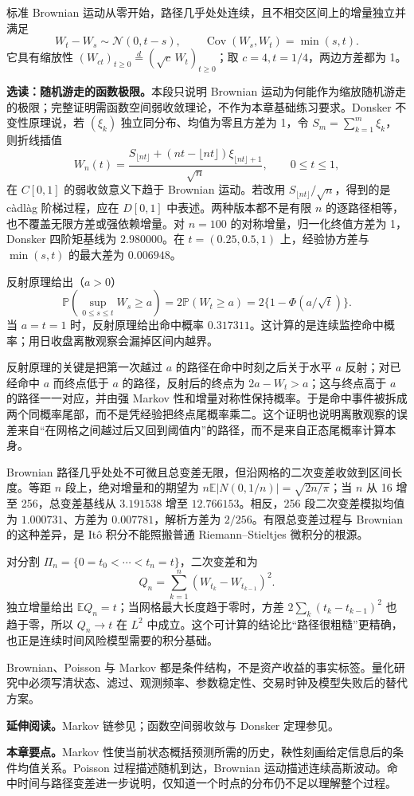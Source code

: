 标准 Brownian 运动从零开始，路径几乎处处连续，且不相交区间上的增量独立并满足
\[
W_t-W_s\sim\mathcal N(0,t-s),\qquad \operatorname{Cov}(W_s,W_t)=\min(s,t).
\]
它具有缩放性 $(W_{ct})_{t\ge0}\overset d=(\sqrt c\,W_t)_{t\ge0}$；取 $c=4,t=1/4$，两边方差都为 1。\par\medskip\noindent\textbf{选读：随机游走的函数极限。}本段只说明 Brownian 运动为何能作为缩放随机游走的极限；完整证明需函数空间弱收敛理论，不作为本章基础练习要求。Donsker 不变性原理说，若 $(\xi_k)$ 独立同分布、均值为零且方差为 1，令 $S_m=\sum_{k=1}^m\xi_k$，则折线插值
\[
 W_n(t)=\frac{S_{\lfloor nt\rfloor}
 +(nt-\lfloor nt\rfloor)\xi_{\lfloor nt\rfloor+1}}{\sqrt n},
 \qquad 0\le t\le1,
\]
在 $C[0,1]$ 的弱收敛意义下趋于 Brownian 运动。若改用
$S_{\lfloor nt\rfloor}/\sqrt n$，得到的是 càdlàg 阶梯过程，应在
$D[0,1]$ 中表述。两种版本都不是有限 $n$ 的逐路径相等，也不覆盖无限方差或强依赖增量。对 $n=100$ 的对称增量，归一化终值方差为 1，Donsker 四阶矩基线为 $2.980000$。在 $t=(0.25,0.5,1)$ 上，经验协方差与 $\min(s,t)$ 的最大差为 $0.006948$。

反射原理给出（$a>0$）
\[
\mathbb P\!\left(\sup_{0\le s\le t}W_s\ge a\right)
=2\mathbb P(W_t\ge a)=2\{1-\Phi(a/\sqrt t)\}.
\]
当 $a=t=1$ 时，反射原理给出命中概率 $0.317311$。这计算的是连续监控命中概率；用日收盘离散观察会漏掉区间内越界。

反射原理的关键是把第一次越过 $a$ 的路径在命中时刻之后关于水平 $a$ 反射；对已经命中 $a$ 而终点低于 $a$ 的路径，反射后的终点为 $2a-W_t>a$；这与终点高于 $a$ 的路径一一对应，并由强 Markov 性和增量对称性保持概率。于是命中事件被拆成两个同概率尾部，而不是凭经验把终点尾概率乘二。这个证明也说明离散观察的误差来自“在网格之间越过后又回到阈值内”的路径，而不是来自正态尾概率计算本身。

Brownian 路径几乎处处不可微且总变差无限，但沿网格的二次变差收敛到区间长度。等距 $n$ 段上，绝对增量和的期望为 $n\mathbb E|N(0,1/n)|=\sqrt{2n/\pi}$；当 $n$ 从 16 增至 256，总变差基线从 $3.191538$ 增至 $12.766153$。相反，256 段二次变差模拟均值为 $1.000731$、方差为 $0.007781$，解析方差为 $2/256$。有限总变差过程与 Brownian 的这种差异，是 Itô 积分不能照搬普通 Riemann--Stieltjes 微积分的根源。

对分割 $\Pi_n=\{0=t_0<\cdots<t_n=t\}$，二次变差和为
\[
 Q_n=\sum_{k=1}^n(W_{t_k}-W_{t_{k-1}})^2.
\]
独立增量给出 $\mathbb E Q_n=t$；当网格最大长度趋于零时，方差
$2\sum_k(t_k-t_{k-1})^2$ 也趋于零，所以 $Q_n\to t$ 在 $L^2$ 中成立。这个可计算的结论比“路径很粗糙”更精确，也正是连续时间风险模型需要的积分基础。

\begin{note}
Brownian、Poisson 与 Markov 都是条件结构，不是资产收益的事实标签。量化研究中必须写清状态、滤过、观测频率、参数稳定性、交易时钟及模型失败后的替代方案。
\end{note}

\noindent\textbf{延伸阅读。}Markov 链参见\cite{norris1997markov}；函数空间弱收敛与 Donsker 定理参见\cite{billingsley1999convergence}。




\noindent\textbf{本章要点。}Markov 性使当前状态概括预测所需的历史，鞅性刻画给定信息后的条件均值关系。Poisson 过程描述随机到达，Brownian 运动描述连续高斯波动。命中时间与路径变差进一步说明，仅知道一个时点的分布仍不足以理解整个过程。